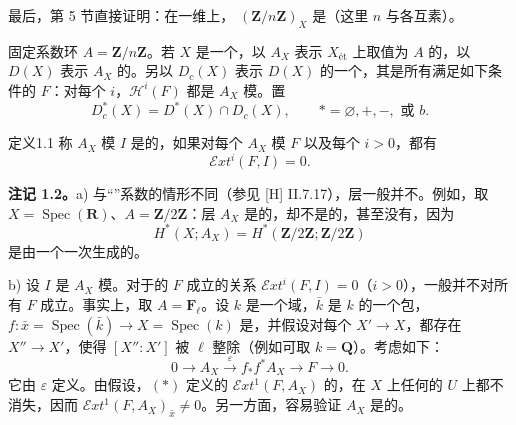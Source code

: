 最后，第 5 节直接证明：在一维上， $(\mathbf Z/n\mathbf Z)_X$ 是（这里 $n$ 与各互素）。

固定系数环 $A=\mathbf Z/n\mathbf Z$。若 $X$ 是一个，以 $A_X$ 表示 $X_{\text{ét}}$ 上取值为 $A$ 的，以 $D(X)$ 表示 $A_X$ 的。另以 $D_c(X)$ 表示 $D(X)$ 的一个，其是所有满足如下条件的 $F$：对每个 $i$，$\mathcal H^i(F)$ 都是 $A_X$ 模。置
\[
 D_c^*(X)=D^*(X)\cap D_c(X),\qquad *=\varnothing,+,-,\text{ 或 }b.
\]
\begin{SGAresult}{定义}{1.1}
称 $A_X$ 模 $I$ 是的，如果对每个 $A_X$ 模 $F$ 以及每个 $i>0$，都有
\[
 \mathcal Ext^i(F,I)=0.
\]
\end{SGAresult}
\textbf{注记 1.2。}a) 与“”系数的情形不同（参见 [H] II.7.17），层一般并不。例如，取 $X=\operatorname{Spec}(\mathbf R)$、$A=\mathbf Z/2\mathbf Z$：层 $A_X$ 是的，却不是的，甚至没有，因为
\[
 H^*(X;A_X)=H^*(\mathbf Z/2\mathbf Z;\mathbf Z/2\mathbf Z)
\]
是由一个一次生成的。

b) 设 $I$ 是 $A_X$ 模。对于的 $F$ 成立的关系 $\mathcal Ext^i(F,I)=0$（$i>0$），一般并不对所有 $F$ 成立。事实上，取 $A=\mathbf F_\ell$。设 $k$ 是一个域，$\bar k$ 是 $k$ 的一个包，$f:\bar x=\operatorname{Spec}(\bar k)\longrightarrow X=\operatorname{Spec}(k)$ 是，并假设对每个 $X'\longrightarrow X$，都存在 $X''\longrightarrow X'$，使得 $[X'':X']$ 被 $\ell$ 整除（例如可取 $k=\mathbf Q$）。考虑如下：
\[
 0\longrightarrow A_X\xrightarrow{\varepsilon}f_*f^*A_X\longrightarrow F\longrightarrow0.\tag{*}
\]
它由 $\varepsilon$ 定义。由假设，$(*)$ 定义的 $\mathcal Ext^1(F,A_X)$ 的，在 $X$ 上任何的 $U$ 上都不消失，因而 $\mathcal Ext^1(F,A_X)_{\bar x}\ne0$。另一方面，容易验证 $A_X$ 是的。

